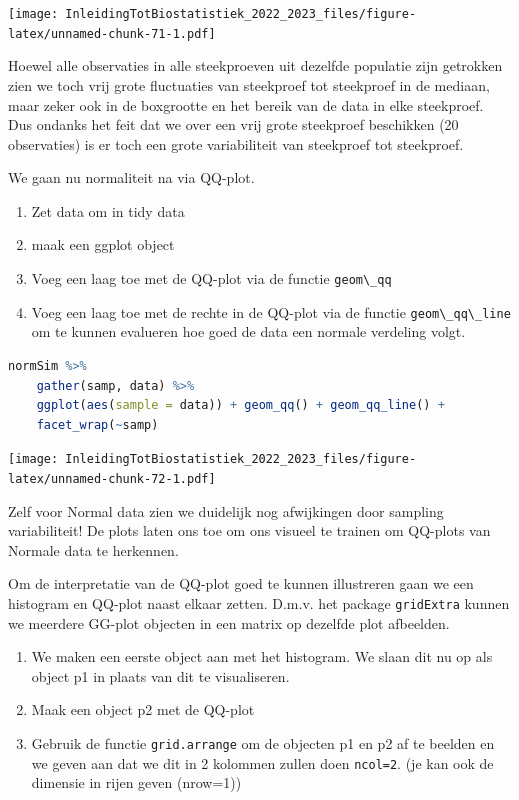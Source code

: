 \documentclass[
  12pt,dutch,coursenotes]{book}
\newcommand{\passthrough}[1]{#1}
\providecommand{\tightlist}{%
  \setlength{\itemsep}{0pt}\setlength{\parskip}{0pt}}
\begin{document}
\texttt{[image: InleidingTotBiostatistiek\_2022\_2023\_files/figure-latex/unnamed-chunk-71-1.pdf]}

Hoewel alle observaties in alle steekproeven uit dezelfde populatie zijn getrokken zien we toch vrij grote fluctuaties van steekproef tot steekproef in de mediaan, maar zeker ook in de boxgrootte en het bereik van de data in elke steekproef. Dus ondanks het feit dat we over een vrij grote steekproef beschikken (20 observaties) is er toch een grote variabiliteit van steekproef tot steekproef.

We gaan nu normaliteit na via QQ-plot.

\begin{enumerate}
\def\labelenumi{\arabic{enumi}.}
\tightlist
\item
  Zet data om in tidy data
\item
  maak een ggplot object
\item
  Voeg een laag toe met de QQ-plot via de functie \passthrough{\lstinline!geom\_qq!}
\item
  Voeg een laag toe met de rechte in de QQ-plot via de functie \passthrough{\lstinline!geom\_qq\_line!} om te kunnen evalueren hoe goed de data een normale verdeling volgt.
\end{enumerate}

\begin{lstlisting}[language=R]
normSim %>%
    gather(samp, data) %>%
    ggplot(aes(sample = data)) + geom_qq() + geom_qq_line() +
    facet_wrap(~samp)
\end{lstlisting}

\texttt{[image: InleidingTotBiostatistiek\_2022\_2023\_files/figure-latex/unnamed-chunk-72-1.pdf]}

Zelf voor Normal data zien we duidelijk nog afwijkingen door sampling variabiliteit! De plots laten ons toe om ons visueel te trainen om QQ-plots van Normale data te herkennen.

Om de interpretatie van de QQ-plot goed te kunnen illustreren gaan we een histogram en QQ-plot naast elkaar zetten.
D.m.v. het package \passthrough{\lstinline!gridExtra!} kunnen we meerdere GG-plot objecten in een matrix op dezelfde plot afbeelden.

\begin{enumerate}
\def\labelenumi{\arabic{enumi}.}
\tightlist
\item
  We maken een eerste object aan met het histogram. We slaan dit nu op als object p1 in plaats van dit te visualiseren.
\item
  Maak een object p2 met de QQ-plot
\item
  Gebruik de functie \passthrough{\lstinline!grid.arrange!} om de objecten p1 en p2 af te beelden en we geven aan dat we dit in 2 kolommen zullen doen \passthrough{\lstinline!ncol=2!}. (je kan ook de dimensie in rijen geven (nrow=1))
\end{enumerate}
\end{document}
